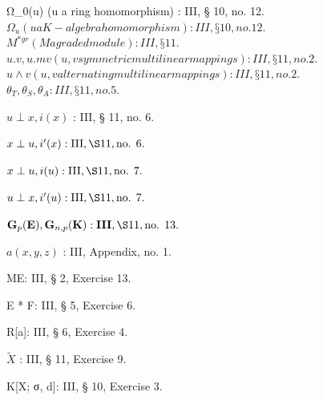 Ω_{0}(u) (u a ring homomorphism) : III, § 10, no. 12.\) \(Ω_{u} (u a K-algebra homomorphism) : III, § 10, no. 12.\) \(M^{*gr} (M a graded module) : III, § 11.\) \(u.v, u.mv (u,v symmetric multilinear mappings) : III, § 11, no. 2.\) \(u \wedge v (u,v alternating multilinear mappings) : III, § 11, no. 2.\) \(θ_{T}, θ_{S}, θ_{A} : III, § 11, no. 5.\)

\(u \perp x, i(x)\) : III, § 11, no. 6.

\(x \perp u, i'(x): \text{III}, \S 11, \text{no. } 6.\)

\(x \perp u, i(u): \text{III}, \S 11, \text{no. } 7.\)

\(u \perp x, i'(u): \text{III}, \S 11, \text{no. } 7.\)

\(\mathbf{G}_p(\mathbf{E}), \mathbf{G}_{n,p}(\mathbf{K}) : \mathbf{III}, \S 11, \text{no. } 13.\)

\(a(x,y,z)\) : III, Appendix, no. 1.

ME: III, § 2, Exercise 13.

E * F: III, § 5, Exercise 6.

R{[}a{]}: III, § 6, Exercise 4.

\(\tilde{X}\) : III, § 11, Exercise 9.

K{[}X; σ, d{]}: III, § 10, Exercise 3.


